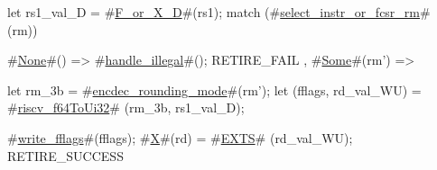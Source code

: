 let rs1_val_D = #\hyperref[sailRISCVzFzyorzyXzyD]{F\_or\_X\_D}#(rs1);
match (#\hyperref[sailRISCVzselectzyinstrzyorzyfcsrzyrm]{select\_instr\_or\_fcsr\_rm}# (rm)) {
  #\hyperref[sailRISCVzNone]{None}#() => { #\hyperref[sailRISCVzhandlezyillegal]{handle\_illegal}#(); RETIRE_FAIL },
  #\hyperref[sailRISCVzSome]{Some}#(rm') => {
    let rm_3b = #\hyperref[sailRISCVzencdeczyroundingzymode]{encdec\_rounding\_mode}#(rm');
    let (fflags, rd_val_WU) = #\hyperref[sailRISCVzriscvzyf64ToUi32]{riscv\_f64ToUi32}# (rm_3b, rs1_val_D);

    #\hyperref[sailRISCVzwritezyfflags]{write\_fflags}#(fflags);
    #\hyperref[sailRISCVzX]{X}#(rd) = #\hyperref[sailRISCVzEXTS]{EXTS}# (rd_val_WU);
    RETIRE_SUCCESS
  }
}

